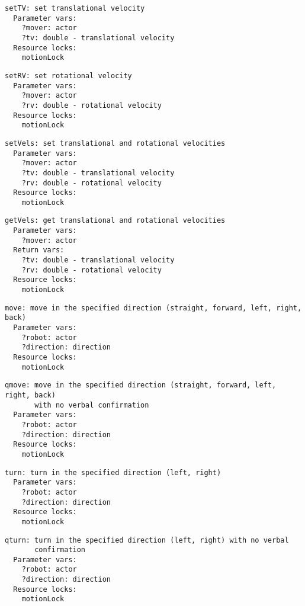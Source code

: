 \documentclass[11pt,letterpaper]{article}
\begin{document}
\begin{Verbatim}
setTV: set translational velocity
  Parameter vars:
    ?mover: actor
    ?tv: double - translational velocity
  Resource locks:
    motionLock
\end{Verbatim}

\begin{Verbatim}
setRV: set rotational velocity
  Parameter vars:
    ?mover: actor
    ?rv: double - rotational velocity
  Resource locks:
    motionLock
\end{Verbatim}

\begin{Verbatim}
setVels: set translational and rotational velocities
  Parameter vars:
    ?mover: actor
    ?tv: double - translational velocity
    ?rv: double - rotational velocity
  Resource locks:
    motionLock
\end{Verbatim}

\begin{Verbatim}
getVels: get translational and rotational velocities
  Parameter vars:
    ?mover: actor
  Return vars:
    ?tv: double - translational velocity
    ?rv: double - rotational velocity
  Resource locks:
    motionLock
\end{Verbatim}

\begin{Verbatim}
move: move in the specified direction (straight, forward, left, right, back)
  Parameter vars:
    ?robot: actor
    ?direction: direction
  Resource locks:
    motionLock
\end{Verbatim}

\begin{Verbatim}
qmove: move in the specified direction (straight, forward, left, right, back) 
       with no verbal confirmation
  Parameter vars: 
    ?robot: actor
    ?direction: direction
  Resource locks:
    motionLock
\end{Verbatim}

\begin{Verbatim}
turn: turn in the specified direction (left, right)
  Parameter vars:
    ?robot: actor
    ?direction: direction
  Resource locks:
    motionLock
\end{Verbatim}

\begin{Verbatim}
qturn: turn in the specified direction (left, right) with no verbal 
       confirmation
  Parameter vars:
    ?robot: actor
    ?direction: direction
  Resource locks:
    motionLock
\end{Verbatim}
\end{document}
